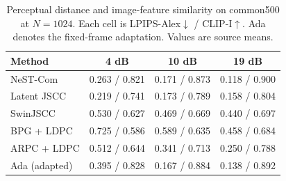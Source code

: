 \begin{table}[t]
\caption{Perceptual distance and image-feature similarity on common500 at $N=1024$. Each cell is LPIPS-Alex$\downarrow$ / CLIP-I$\uparrow$. Ada denotes the fixed-frame adaptation. Values are source means.}
\label{tab:external}
\centering\footnotesize
\setlength{\tabcolsep}{3pt}
\begin{tabular}{lccc}
\toprule Method & 4 dB & 10 dB & 19 dB \\
\midrule
NeST-Com & 0.263 / 0.821 & 0.171 / 0.873 & 0.118 / 0.900 \\
Latent JSCC & 0.219 / 0.741 & 0.173 / 0.789 & 0.158 / 0.804 \\
SwinJSCC & 0.530 / 0.627 & 0.469 / 0.669 & 0.440 / 0.697 \\
BPG + LDPC & 0.725 / 0.586 & 0.589 / 0.635 & 0.458 / 0.684 \\
ARPC + LDPC & 0.512 / 0.644 & 0.341 / 0.713 & 0.250 / 0.788 \\
Ada (adapted) & 0.395 / 0.828 & 0.167 / 0.884 & 0.138 / 0.892 \\
\bottomrule
\end{tabular}
\end{table}
